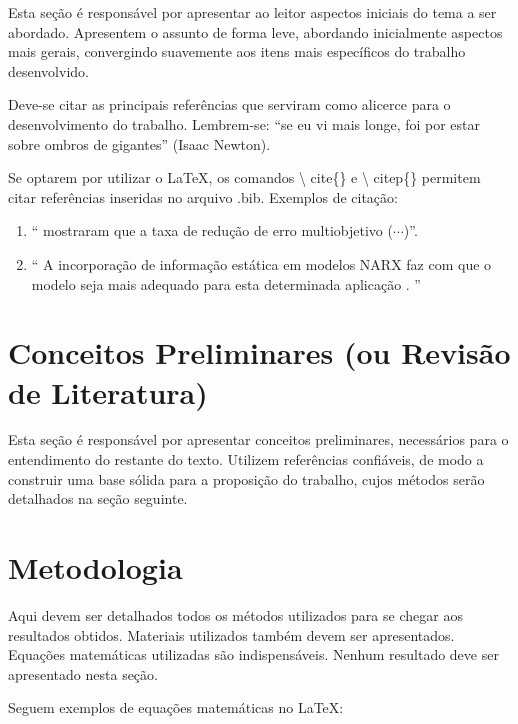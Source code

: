 \documentclass[12pt,titlepage]{article}
\begin{document}
Esta seção é responsável por apresentar ao leitor aspectos iniciais do tema a 
ser abordado. Apresentem o assunto de forma leve, abordando 
inicialmente aspectos mais gerais, convergindo suavemente aos itens mais 
específicos do trabalho desenvolvido.

Deve-se citar as principais referências que serviram como alicerce para o 
desenvolvimento do trabalho. Lembrem-se: ``se eu vi mais longe, foi por estar 
sobre ombros de gigantes'' (Isaac Newton).

Se optarem por utilizar o \LaTeX, os comandos \textbackslash \! cite\{\} e 
\textbackslash \! citep\{\} permitem citar referências inseridas no arquivo 
.bib. Exemplos de citação: 

\begin{enumerate}
 \item ``\cite{Martins2013} mostraram que a taxa de 
redução de erro multiobjetivo ($\cdots$)''.

 \item `` A incorporação de informação estática em modelos NARX faz com que o 
modelo seja mais adequado para esta determinada aplicação \citep{Martins2013}. 
''
\end{enumerate}


\section{Conceitos Preliminares (ou Revisão de Literatura)}
\label{sec:revlit}

Esta seção é responsável por apresentar conceitos preliminares, necessários 
para o entendimento do restante do texto. Utilizem referências confiáveis, de 
modo a construir uma base sólida para a proposição do trabalho, cujos métodos 
serão detalhados na seção seguinte.



\section{Metodologia}
\label{sec:meto}

Aqui devem ser detalhados todos os métodos utilizados para se chegar 
aos resultados obtidos. Materiais utilizados também devem ser apresentados. 
Equações matemáticas utilizadas são indispensáveis. Nenhum resultado deve ser 
apresentado nesta seção. 

Seguem exemplos de equações matemáticas no \LaTeX:
\end{document}
